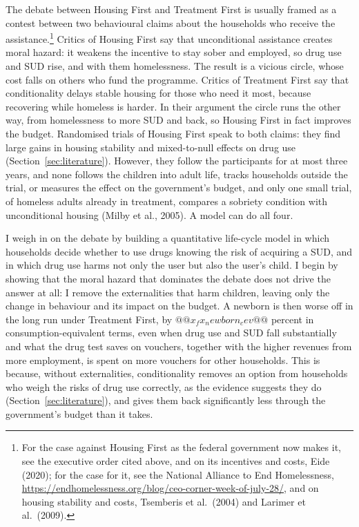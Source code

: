 \documentclass[10pt]{article}
\begin{document}
The debate between Housing First and Treatment First is usually framed as a contest between two behavioural claims about the households who receive the assistance.\footnote{For the case
against Housing First as the federal government now makes it, see the executive order
cited above, and on its incentives and costs, Eide (2020); for the case for it, see the National Alliance to End Homelessness,
\url{https://endhomelessness.org/blog/ceo-corner-week-of-july-28/}, and on housing stability and costs, Tsemberis et al.\ (2004) and Larimer et al.\ (2009).} Critics of Housing First say that unconditional assistance creates moral hazard: it weakens the incentive to stay sober and employed, so drug use and SUD rise, and with them homelessness. The result is a vicious circle, whose cost falls on others who fund the programme. Critics of Treatment First say that conditionality delays stable housing for those who need it most, because recovering while homeless is harder. In their argument the circle runs the other way, from homelessness to more SUD and back, so Housing First in fact improves the budget. Randomised trials of Housing First speak to both claims: they find large gains in housing stability and mixed-to-null effects on drug use (Section~\ref{sec:literature}). However, they follow the participants for at most three years, and none follows the children into adult life, tracks households outside the trial, or measures the effect on the government's budget, and only one small trial, of homeless adults already in treatment, compares a sobriety condition with unconditional housing (Milby et al., 2005). A model can do all four.

I weigh in on the debate by building a quantitative life-cycle model in which households decide whether to use drugs knowing the risk of acquiring a SUD, and in which drug use harms not only the user but also the user's child. I begin by showing that the moral hazard that dominates the debate does not drive the answer at all: I remove the externalities that harm children, leaving only the change in behaviour and its impact on the budget. A newborn is then worse off in the long run under Treatment First, by $@@x_fx_newborn_cev@@$ percent in consumption-equivalent terms, even when drug use and SUD fall substantially and what the drug test saves on vouchers, together with the higher revenues from more employment, is spent on more vouchers for other households. This is because, without externalities, conditionality removes an option from households who weigh the risks of drug use correctly, as the evidence suggests they do (Section~\ref{sec:literature}), and gives them back significantly less through the government's budget than it takes.
\end{document}
